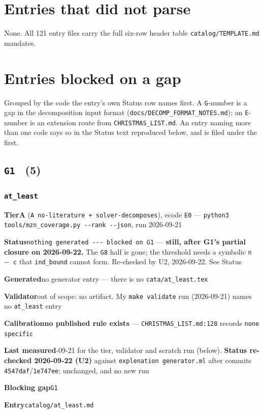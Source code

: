 \documentclass[10pt,a4paper]{article}
\newcommand{\entryfield}[2]{{\raggedright\textbf{#1}\quad #2\par}}
\begin{document}
\section{Entries that did not parse}
None. All 121 entry files carry the full six-row header table \texttt{catalog/TEMPLATE.md} mandates.
\clearpage
\section{Entries blocked on a gap}
Grouped by the code the entry's own Status row names first. A \texttt{G}-number is a gap in the decomposition input format (\texttt{docs/DECOMP\_FORMAT\_NOTES.md}); an \texttt{E}-number is an extension route from \texttt{CHRISTMAS\_LIST.md}. An entry naming more than one code says so in the Status text reproduced below, and is filed under the first.
\subsection*{\texttt{G1} \ \normalsize(5)}
\subsubsection*{\texttt{at\_\allowbreak{}least}}
\label{entry:at-least}
\entryfield{Tier}{\textbf{A} (\texttt{A no-\allowbreak{}literature + solver-\allowbreak{}decomposes}), ecode \texttt{E0} --- \texttt{python3 tools/\allowbreak{}mzn\_\allowbreak{}coverage.\allowbreak{}py -\allowbreak{}-\allowbreak{}rank -\allowbreak{}-\allowbreak{}json}, run 2026-09-21}
\entryfield{Status}{\texttt{nothing generated -\allowbreak{}-\allowbreak{}-\allowbreak{} blocked on G1} --- \textbf{still, after G1's partial closure on 2026-09-22.} The \texttt{G8} half is gone; the threshold needs a symbolic \texttt{n $-$ c} that \texttt{ind\_bound} cannot form. Re-checked by U2, 2026-09-22. See Status}
\entryfield{Generated}{no generator entry --- there is no \texttt{cata/at\_least.tex}}
\entryfield{Validator}{out of scope: no artifact. My \texttt{make validate} run (2026-09-21) names no \texttt{at\_least} entry}
\entryfield{Calibration}{\textbf{no published rule exists} --- \texttt{CHRISTMAS\_LIST.md:128} records \texttt{none specific}}
\entryfield{Last measured}{2026-09-21 for the tier, validator and scratch run (below). \textbf{Status re-checked 2026-09-22 (U2)} against \texttt{explenation generator.ml} after commits \texttt{4547daf}/\texttt{1e747ee}; unchanged, and no new run}
\entryfield{Blocking gap}{\texttt{G1}}
\entryfield{Entry}{\texttt{catalog/at\_least.md}}
\end{document}
